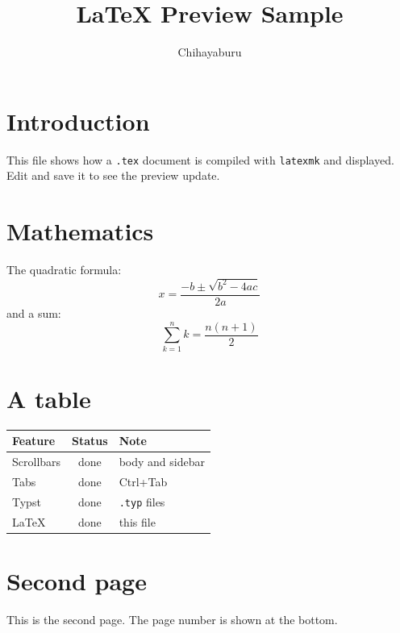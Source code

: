 \documentclass[a4paper,11pt]{article}
\title{LaTeX Preview Sample}
\author{Chihayaburu}
\date{}
\begin{document}
\maketitle

\section{Introduction}
This file shows how a \texttt{.tex} document is compiled with \texttt{latexmk}
and displayed. Edit and save it to see the preview update.

\section{Mathematics}
The quadratic formula:
\[
  x = \frac{-b \pm \sqrt{b^2 - 4ac}}{2a}
\]
and a sum:
\begin{equation}
  \sum_{k=1}^{n} k = \frac{n(n+1)}{2}
\end{equation}

\section{A table}
\begin{tabular}{lcl}
  \hline
  Feature & Status & Note \\
  \hline
  Scrollbars & done & body and sidebar \\
  Tabs       & done & Ctrl+Tab \\
  Typst      & done & \texttt{.typ} files \\
  LaTeX      & done & this file \\
  \hline
\end{tabular}

\newpage
\section{Second page}
This is the second page. The page number is shown at the bottom.
\end{document}
